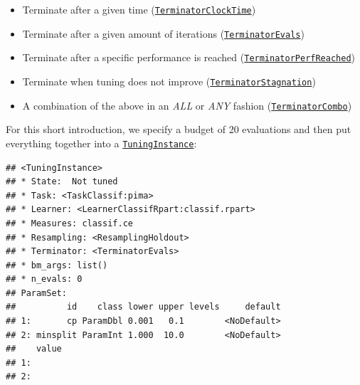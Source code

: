 \documentclass[]{article}
\newenvironment{Shaded}{\begin{snugshade}}{\end{snugshade}}
\newcommand{\DataTypeTok}[1]{\textcolor[rgb]{0.13,0.29,0.53}{#1}}
\newcommand{\DecValTok}[1]{\textcolor[rgb]{0.00,0.00,0.81}{#1}}
\newcommand{\KeywordTok}[1]{\textcolor[rgb]{0.13,0.29,0.53}{\textbf{#1}}}
\newcommand{\NormalTok}[1]{#1}
\newcommand{\OperatorTok}[1]{\textcolor[rgb]{0.81,0.36,0.00}{\textbf{#1}}}
\newcommand{\StringTok}[1]{\textcolor[rgb]{0.31,0.60,0.02}{#1}}
\providecommand{\tightlist}{%
  \setlength{\itemsep}{0pt}\setlength{\parskip}{0pt}}
\renewenvironment{Shaded} {\begin{snugshade}\small} {\end{snugshade}}
\begin{document}
\begin{itemize}
\tightlist
\item
  Terminate after a given time (\href{https://mlr3tuning.mlr-org.com/reference/mlr_terminators_clock_time.html}{\texttt{TerminatorClockTime}})
\item
  Terminate after a given amount of iterations (\href{https://mlr3tuning.mlr-org.com/reference/mlr_terminators_evals.html}{\texttt{TerminatorEvals}})
\item
  Terminate after a specific performance is reached (\href{https://mlr3tuning.mlr-org.com/reference/mlr_terminators_perf_reached.html}{\texttt{TerminatorPerfReached}})
\item
  Terminate when tuning does not improve (\href{https://mlr3tuning.mlr-org.com/reference/mlr_terminators_stagnation.html}{\texttt{TerminatorStagnation}})
\item
  A combination of the above in an \emph{ALL} or \emph{ANY} fashion (\href{https://mlr3tuning.mlr-org.com/reference/mlr_terminators_combo.html}{\texttt{TerminatorCombo}})
\end{itemize}

For this short introduction, we specify a budget of 20 evaluations and then put everything together into a \href{https://mlr3tuning.mlr-org.com/reference/TuningInstance.html}{\texttt{TuningInstance}}:

\begin{Shaded}
\end{Shaded}

\begin{verbatim}
## <TuningInstance>
## * State:  Not tuned
## * Task: <TaskClassif:pima>
## * Learner: <LearnerClassifRpart:classif.rpart>
## * Measures: classif.ce
## * Resampling: <ResamplingHoldout>
## * Terminator: <TerminatorEvals>
## * bm_args: list()
## * n_evals: 0
## ParamSet: 
##          id    class lower upper levels     default
## 1:       cp ParamDbl 0.001   0.1        <NoDefault>
## 2: minsplit ParamInt 1.000  10.0        <NoDefault>
##    value
## 1:      
## 2:
\end{verbatim}
\end{document}
